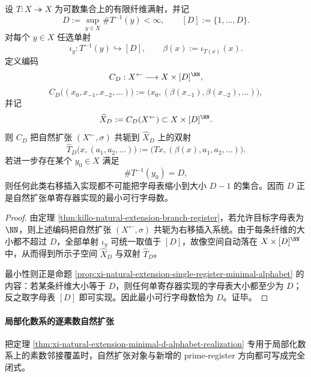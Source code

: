 \begin{theorem}[有界纤维满射的最小字母自然扩张实现]\label{thm:xi-natural-extension-minimal-d-alphabet-realization}
设 \(T:X\twoheadrightarrow X\) 为可数集合上的有限纤维满射，并记
\[
D:=\sup_{y\in X}\#T^{-1}(y)<\infty,
\qquad
[D]:=\{1,\dots,D\}.
\]
对每个 \(y\in X\) 任选单射
\[
\iota_y:T^{-1}(y)\hookrightarrow [D],
\qquad
\beta(x):=\iota_{T(x)}(x).
\]
定义编码
\[
C_D:X^{\leftarrow}\longrightarrow X\times [D]^{\NN},
\]
\[
C_D\bigl((x_0,x_{-1},x_{-2},\dots)\bigr)
:=
\bigl(x_0,(\beta(x_{-1}),\beta(x_{-2}),\dots)\bigr),
\]
并记
\[
\widehat X_D:=C_D(X^{\leftarrow})\subset X\times [D]^{\NN}.
\]
则 \(C_D\) 把自然扩张 \((X^{\leftarrow},\sigma)\) 共轭到 \(\widehat X_D\) 上的双射
\[
\widehat T_D\bigl(x,(a_1,a_2,\dots)\bigr)
:=
\bigl(Tx,(\beta(x),a_1,a_2,\dots)\bigr).
\]
若进一步存在某个 \(y_0\in X\) 满足
\[
\#T^{-1}(y_0)=D,
\]
则任何此类右移插入实现都不可能把字母表缩小到大小 \(D-1\) 的集合。因而 \(D\) 正是自然扩张单寄存器实现的最小可行字母数。
\end{theorem}
\begin{proof}
由定理 \ref{thm:killo-natural-extension-branch-register}，若允许目标字母表为 \(\NN\)，则上述编码把自然扩张 \((X^{\leftarrow},\sigma)\) 共轭为右移插入系统。由于每条纤维的大小都不超过 \(D\)，全部单射 \(\iota_y\) 可统一取值于 \([D]\)，故像空间自动落在 \(X\times [D]^{\NN}\) 中，从而得到所示子空间 \(\widehat X_D\) 与双射 \(\widehat T_D\)。

最小性则正是命题 \ref{prop:xi-natural-extension-single-register-minimal-alphabet} 的内容：若某条纤维大小等于 \(D\)，则任何单寄存器实现的字母表大小都至少为 \(D\)；反之取字母表 \([D]\) 即可实现。因此最小可行字母数恰为 \(D\)。证毕。
\end{proof}

\paragraph{局部化数系的逐素数自然扩张}
把定理 \ref{thm:xi-natural-extension-minimal-d-alphabet-realization} 专用于局部化数系上的素数邻接覆盖时，自然扩张对象与新增的 prime-register 方向都可写成完全闭式。

